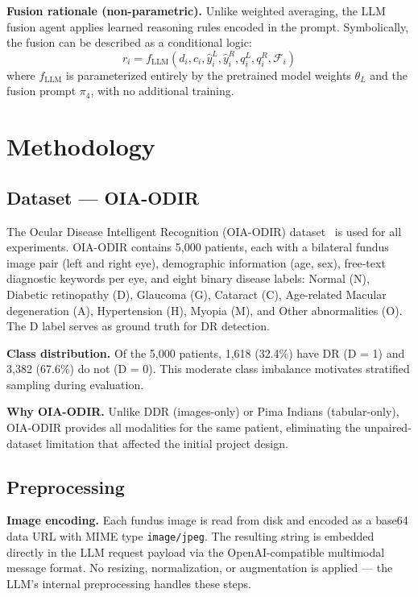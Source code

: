 \documentclass[11pt,a4paper]{article}
\begin{document}
\textbf{Fusion rationale (non-parametric).} Unlike weighted averaging, the LLM fusion agent applies learned reasoning rules encoded in the prompt. Symbolically, the fusion can be described as a conditional logic:
\begin{equation}
r_i = f_{\text{LLM}}(d_i, c_i, \hat{y}_i^L, \hat{y}_i^R, q_i^L, q_i^R, \mathcal{F}_i)
\end{equation}
where $f_{\text{LLM}}$ is parameterized entirely by the pretrained model weights $\theta_L$ and the fusion prompt $\pi_4$, with no additional training.

\section{Methodology}

\subsection{Dataset --- OIA-ODIR}

The Ocular Disease Intelligent Recognition (OIA-ODIR) dataset~\cite{li2019oiaodir} is used for all experiments. OIA-ODIR contains 5,000 patients, each with a bilateral fundus image pair (left and right eye), demographic information (age, sex), free-text diagnostic keywords per eye, and eight binary disease labels: Normal (N), Diabetic retinopathy (D), Glaucoma (G), Cataract (C), Age-related Macular degeneration (A), Hypertension (H), Myopia (M), and Other abnormalities (O). The D label serves as ground truth for DR detection.

\textbf{Class distribution.} Of the 5,000 patients, 1,618 (32.4\%) have DR (D = 1) and 3,382 (67.6\%) do not (D = 0). This moderate class imbalance motivates stratified sampling during evaluation.

\textbf{Why OIA-ODIR.} Unlike DDR (images-only) or Pima Indians (tabular-only), OIA-ODIR provides all modalities for the same patient, eliminating the unpaired-dataset limitation that affected the initial project design.

\subsection{Preprocessing}

\textbf{Image encoding.} Each fundus image is read from disk and encoded as a base64 data URL with MIME type \texttt{image/jpeg}. The resulting string is embedded directly in the LLM request payload via the OpenAI-compatible multimodal message format. No resizing, normalization, or augmentation is applied --- the LLM's internal preprocessing handles these steps.
\end{document}

